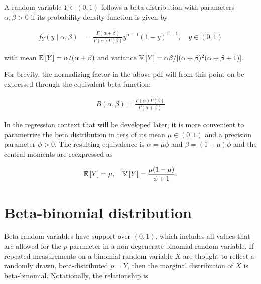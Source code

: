 A random variable $Y \in (0,1)$ follows a beta distribution with parameters $\alpha, \beta > 0$ if its probability density function is given by

\begin{equation}
\begin{split}
f_{Y}(y \mid \alpha, \beta)
&= \frac{\Gamma(\alpha+\beta)}{\Gamma(\alpha)\Gamma(\beta)}y^{\alpha-1}(1-y)^{\beta-1},\quad y \in (0,1)
\end{split}
\end{equation}

with mean ${\mathbb E}\left[ Y \right] = \alpha / (\alpha+ \beta)$ and variance ${\mathbb V}\left[ Y \right] = \alpha \beta/[(\alpha+\beta)^2(\alpha+\beta+1)]$.

For brevity, the normalizing factor in the above pdf will from this point on be expressed through the equivalent beta function:

\begin{equation}
\label{beta-function}
\begin{split}
B(\alpha, \beta) = \frac{\Gamma(\alpha)\Gamma(\beta)}{\Gamma(\alpha+\beta)}
\end{split}
\end{equation}

In the regression context that will be developed later, it is more convenient to parametrize the beta distribution in ters of its mean $\mu \in (0,1)$ and a precision parameter $\phi > 0$. The resulting equivalence is  $\alpha = \mu\phi$ and $\beta = (1-\mu)\phi$ and the central moments are reexpressed as

\cite{ferrari2004beta}

\begin{equation}
\begin{split}
{\mathbb E}\left[ Y \right] = \mu, \quad {\mathbb V}\left[ Y \right] = \frac{\mu(1-\mu)}{\phi+1}.
\end{split}
\end{equation}

\section{Beta-binomial distribution}
\label{sec:bbin-dist}

Beta random variables have support over $(0,1)$, which includes all values that are allowed for the $p$ parameter in a non-degenerate binomial random variable. If repeated measurements on a binomial random variable $X$ are thought to reflect a randomly drawn, beta-distributed $p=Y$, then the marginal distribution of $X$ is beta-binomial. Notationally, the relationship is

